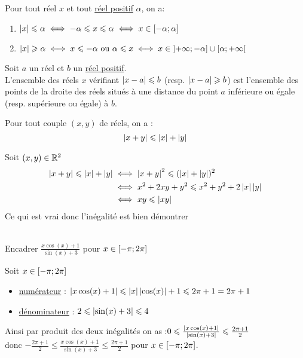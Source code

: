 \begin{defprop}
	Pour tout réel \(x\) et tout \underline{réel positif} \(\alpha\), on a:
	\begin{enumerate}
		\item \(\left\lvert x\right\rvert\leqslant \alpha \iff -\alpha \leqslant x \leqslant \alpha \iff x \in \left[-\alpha;\alpha\right]\)
		\item \(\left\lvert x\right\rvert\geqslant \alpha \iff x \leqslant -\alpha\text{ ou } \alpha \leqslant x \iff x \in \left]+\infty;-\alpha\right]\cup\left[\alpha;+\infty\right[\)
	\end{enumerate}
\end{defprop}

\begin{defprop}
	Soit \(a\) un réel et \(b\) un \underline{réel positif}. \\
	L’ensemble des réels \(x\) vérifiant \(\left\lvert x-a\right\rvert\leqslant b\) (resp. \(\left\lvert x-a\right\rvert\geqslant b \)) est l’ensemble des points de la droite des
	réels situés à une distance du point \(a\) inférieure ou égale (resp. supérieure ou égale) à \(b\).
\end{defprop}

\begin{prop}
	Pour tout couple \((x,y)\) de réels, on a :
	\[\left\lvert x+y\right\rvert\leqslant \left\lvert x\right\rvert+\left\lvert y\right\rvert\]
\end{prop}

\begin{dem} 
	Soit \((x,y) \in \mathbb{R}^2\)
	\begin{align*}
		\left\lvert x+y\right\rvert\leqslant \left\lvert x\right\rvert+\left\lvert y\right\rvert & \iff \left\lvert x+y\right\rvert^2\leqslant (\left\lvert x\right\rvert+\left\lvert y\right\rvert)^2      \\
		                              & \iff x^2+2xy+y^2 \leqslant x^2+y^2+2\left\lvert x\right\rvert\left\lvert y\right\rvert \\
		                              & \iff xy\leqslant \left\lvert xy\right\rvert
	\end{align*}
	Ce qui est vrai donc l'inégalité est bien démontrer
\end{dem}

\begin{exoex}   
     ~\\
	Encadrer \(\frac{x\cos(x)+1}{\sin(x)+3}\) pour \(x\in\left[-\pi;2\pi\right]\)
\end{exoex}

\begin{corr}
	Soit \(x\in\left[-\pi;2\pi\right]\)
	\begin{itemize}

		\item \underline{numérateur} : \(\left\lvert x\cos(x)+1\right\rvert\leqslant \left\lvert x\right\rvert\left\lvert\cos(x)\right\rvert+1\leqslant 2\pi+1 = 2\pi+1\)
		\item \underline{dénominateur} : \(2\leqslant\left\lvert\sin(x)+3\right\rvert\leqslant 4\)

	\end{itemize}
	Ainsi par produit des deux inégalités on as :\(0\leqslant\frac{\left\lvert x\cos(x)+1\right\rvert}{\left\lvert\sin(x)+3\right\rvert}\leqslant \frac{2\pi+1}{2} \)\\
	donc \(-\frac{2\pi+1}{2} \leq \frac{x\cos(x)+1}{\sin(x)+3} \leq \frac{2\pi+1}{2}\) pour \(x\in\left[-\pi;2\pi\right]\).
\end{corr}

